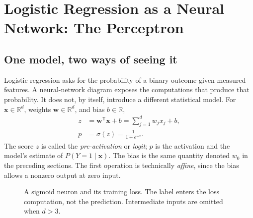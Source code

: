 \section{Logistic Regression as a Neural Network: The Perceptron}
\label{sec:logreg_to_mlp:logistic_regression_as_a_neural_network_the_perceptron}

\subsection{One model, two ways of seeing it}
Logistic regression asks for the probability of a binary outcome given measured features. A neural-network diagram exposes the computations that produce that probability. It does not, by itself, introduce a different statistical model.
For $\mathbf{x}\in\mathbb{R}^d$, weights $\mathbf{w}\in\mathbb{R}^d$, and bias $b\in\mathbb{R}$,
\begin{align}
 z &= \mathbf{w}^{\mathsf T}\mathbf{x}+b
    = \sum_{j=1}^d w_jx_j+b,\\
 p &= \sigma(z)=\frac{1}{1+e^{-z}}.
\end{align}
The score $z$ is called the \emph{pre-activation} or \emph{logit}; $p$ is the activation and the model's estimate of $P(Y=1\mid\mathbf{x})$. The bias is the same quantity denoted $w_0$ in the preceding sections. The first operation is technically \emph{affine}, since the bias allows a nonzero output at zero input.

\begin{figure}[H]
\centering
{}
\caption{A sigmoid neuron and its training loss. The label enters the loss computation, not the prediction. Intermediate inputs are omitted when $d>3$.}
\end{figure}

